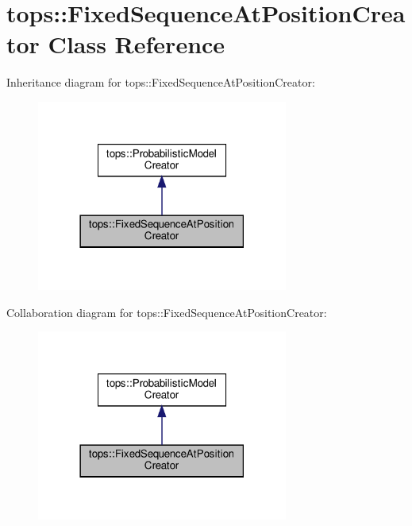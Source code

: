 \hypertarget{classtops_1_1FixedSequenceAtPositionCreator}{}\section{tops\+:\+:Fixed\+Sequence\+At\+Position\+Creator Class Reference}
\label{classtops_1_1FixedSequenceAtPositionCreator}


Inheritance diagram for tops\+:\+:Fixed\+Sequence\+At\+Position\+Creator\+:
\nopagebreak
\begin{figure}[H]
\begin{center}
\leavevmode
\includegraphics[width=234pt]{classtops_1_1FixedSequenceAtPositionCreator__inherit__graph}
\end{center}
\end{figure}


Collaboration diagram for tops\+:\+:Fixed\+Sequence\+At\+Position\+Creator\+:
\nopagebreak
\begin{figure}[H]
\begin{center}
\leavevmode
\includegraphics[width=234pt]{classtops_1_1FixedSequenceAtPositionCreator__coll__graph}
\end{center}
\end{figure}
